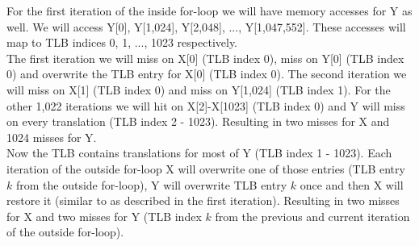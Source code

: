 \documentclass[a4paper, 11pt]{exam}
\begin{document}
\begin{enumerate}
For the first iteration of the inside for-loop we will have memory accesses for Y as well. We will access Y[0], Y[1,024], Y[2,048], ..., Y[1,047,552]. These accesses will map to TLB indices 0, 1, ..., 1023 respectively.\\

The first iteration we will miss on X[0] (TLB index 0), miss on Y[0] (TLB index 0) and overwrite the TLB entry for X[0] (TLB index 0). The second iteration we will miss on X[1] (TLB index 0) and miss on Y[1,024] (TLB index 1). For the other 1,022 iterations we will hit on X[2]-X[1023] (TLB index 0) and Y will miss on every translation (TLB index 2 - 1023). Resulting in two misses for X and 1024 misses for Y. \\

Now the TLB contains translations for most of Y (TLB index 1 - 1023). Each iteration of the outside for-loop X will overwrite one of those entries (TLB entry $k$ from the outside for-loop), Y will overwrite TLB entry $k$ once and then X will restore it (similar to as described in the first iteration). Resulting in two misses for X and two misses for Y (TLB index $k$ from the previous and current iteration of the outside for-loop). \\


\end{enumerate}
\end{document}
